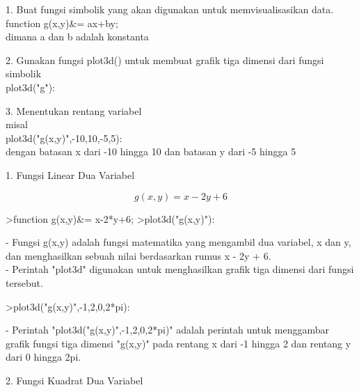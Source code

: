\documentclass{article}
\begin{document}
\begin{eulernotebook}
\begin{eulercomment}
\begin{eulercomment}
\begin{eulercomment}
\begin{eulercomment}
\begin{eulercomment}
1. Buat fungsi simbolik yang akan digunakan untuk memvisualisasikan
data.\\
function g(x,y)\&= ax+by;\\
dimana a dan b adalah konstanta

2. Gunakan fungsi plot3d() untuk membuat grafik tiga dimensi dari
fungsi simbolik\\
plot3d("g"):

3. Menentukan rentang variabel\\
misal\\
plot3d("g(x,y)",-10,10,-5,5):\\
dengan batasan x dari -10 hingga 10 dan batasan y dari -5 hingga 5

\end{eulercomment}
\begin{eulercomment}
1. Fungsi Linear Dua Variabel

\end{eulercomment}
\begin{eulerformula}
\[
g(x,y)=x-2y+6
\]
\end{eulerformula}
\begin{eulercomment}
\end{eulercomment}
\begin{eulerprompt}
>function g(x,y)&= x-2*y+6;
>plot3d("g(x,y)"):
\end{eulerprompt}
\begin{eulercomment}
- Fungsi g(x,y) adalah fungsi matematika yang mengambil dua variabel,
x dan y, dan menghasilkan sebuah nilai berdasarkan rumus x - 2y + 6.\\
- Perintah "plot3d" digunakan untuk menghasilkan grafik tiga dimensi
dari fungsi tersebut.
\end{eulercomment}
\begin{eulerprompt}
>plot3d("g(x,y)",-1,2,0,2*pi):
\end{eulerprompt}
\begin{eulercomment}
- Perintah "plot3d("g(x,y)",-1,2,0,2*pi)" adalah perintah untuk
menggambar grafik fungsi tiga dimensi "g(x,y)" pada rentang x dari -1
hingga 2 dan rentang y dari 0 hingga 2pi.

\end{eulercomment}
\eulersubheading{}
\begin{eulercomment}
2. Fungsi Kuadrat Dua Variabel


\end{eulercomment}
\end{eulercomment}
\end{eulercomment}
\end{eulercomment}
\end{eulercomment}
\end{eulernotebook}
\end{document}
